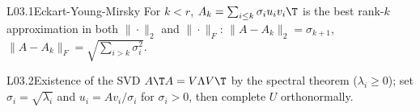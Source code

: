 
\begin{sheetblock}{L03.1}{Eckart-Young-Mirsky}
For \(k < r\), \(A_k = \sum_{i \le k} \sigma_i u_i v_i\T\) is the best rank-\(k\) approximation in both
\(\|\cdot\|_2\) and \(\|\cdot\|_F\):
\(\|A - A_k\|_2 = \sigma_{k+1}\), \quad \(\|A - A_k\|_F = \sqrt{\sum_{i>k} \sigma_i^2}\).
\end{sheetblock}

\begin{refblock}{L03.2}{Existence of the SVD}
\(A\T A = V \Lambda V\T\) by the spectral theorem (\(\lambda_i \ge 0\)); set \(\sigma_i = \sqrt{\lambda_i}\) and
\(u_i = A v_i / \sigma_i\) for \(\sigma_i > 0\), then complete \(U\) orthonormally.
\end{refblock}
